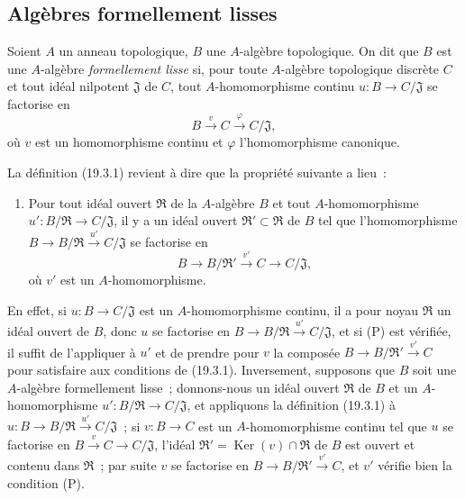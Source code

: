 \subsection{Algèbres formellement lisses}
\label{subsection:0.19.3-fr}

\begin{definition}[19.3.1]
\label{0.19.3.1-fr}
Soient $A$ un anneau topologique, $B$ une $A$-algèbre topologique. On dit que
$B$ est une $A$-algèbre \emph{formellement lisse} si, pour toute
$A$-algèbre topologique discrète $C$ et tout idéal nilpotent $\mathfrak J$ de
$C$, tout $A$-homomorphisme continu $u:B\to C/\mathfrak J$ se factorise en
\[
  B\xrightarrow{v}C\xrightarrow{\varphi}C/\mathfrak J,
\]
où $v$ est un homomorphisme continu et $\varphi$ l'homomorphisme canonique.
\end{definition}


La définition (19.3.1) revient à dire que la propriété suivante a lieu~:
\begin{enumerate}
  \item[(P)] Pour tout idéal ouvert $\mathfrak R$ de la $A$-algèbre $B$ et
  tout $A$-homomorphisme $u':B/\mathfrak R\to C/\mathfrak J$, il y a un
  idéal ouvert $\mathfrak R'\subset\mathfrak R$ de $B$ tel que
  l'homomorphisme
  $B\to B/\mathfrak R\xrightarrow{u'}C/\mathfrak J$ se factorise en
  \[
    B\to B/\mathfrak R'\xrightarrow{v'}C\to C/\mathfrak J,
  \]
  où $v'$ est un $A$-homomorphisme.
\end{enumerate}
En effet, si $u:B\to C/\mathfrak J$ est un $A$-homomorphisme continu, il a
pour noyau $\mathfrak R$ un idéal ouvert de $B$, donc $u$ se factorise en
$B\to B/\mathfrak R\xrightarrow{u'}C/\mathfrak J$, et si (P) est
vérifiée, il suffit de l'appliquer à $u'$ et de prendre pour $v$ la composée
$B\to B/\mathfrak R'\xrightarrow{v'}C$ pour satisfaire aux conditions de
(19.3.1). Inversement, supposons que $B$ soit une $A$-algèbre formellement
lisse~; donnons-nous un idéal ouvert $\mathfrak R$ de $B$ et un
$A$-homomorphisme $u':B/\mathfrak R\to C/\mathfrak J$, et appliquons la
définition (19.3.1) à
$u:B\to B/\mathfrak R\xrightarrow{u'}C/\mathfrak J$~; si
$v:B\to C$ est un $A$-homomorphisme continu tel que $u$ se factorise en
$B\xrightarrow{v}C\to C/\mathfrak J$, l'idéal
$\mathfrak R'=\operatorname{Ker}(v)\cap\mathfrak R$ de $B$ est ouvert et
contenu dans $\mathfrak R$~; par suite $v$ se factorise en
$B\to B/\mathfrak R'\xrightarrow{v'}C$, et $v'$ vérifie bien la condition
(P).

